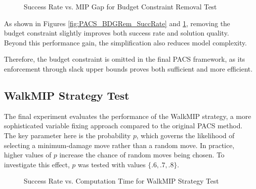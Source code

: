 \begin{figure}[H]
\centering
\begin{minipage}{0.6\columnwidth}
\centering
\resizebox{\linewidth}{!}{}
\end{minipage}%
\hfill
\begin{minipage}{0.4\columnwidth}
\centering
\resizebox{\linewidth}{!}{}
\end{minipage}
\caption{Success Rate vs. MIP Gap for Budget Constraint Removal Test}
\label{fig:PACS_BDGRem_MGAP}
\end{figure}

As shown in Figures \ref{fig:PACS_BDGRem_SuccRate} and \ref{fig:PACS_BDGRem_MGAP}, removing the budget constraint slightly improves both success rate and solution quality. Beyond this performance gain, the simplification also reduces model complexity.

Therefore, the budget constraint is omitted in the final PACS framework, as its enforcement through slack upper bounds proves both sufficient and more efficient.

\subsection{WalkMIP Strategy Test}\label{sec:test_walkMIP}
The final experiment evaluates the performance of the WalkMIP strategy, a more sophisticated variable fixing approach compared to the original PACS method. The key parameter here is the probability $p$, which governs the likelihood of selecting a minimum-damage move rather than a random move. In practice, higher values of $p$ increase the chance of random moves being chosen. To investigate this effect, $p$ was tested with values $\{.6, .7, .8\}$.
\begin{figure}[H]
\centering
\begin{minipage}{0.6\columnwidth}
\centering
\resizebox{\linewidth}{!}{}
\end{minipage}%
\hfill
\begin{minipage}{0.4\columnwidth}
\centering
\resizebox{\linewidth}{!}{}
\end{minipage}
\caption{Success Rate vs. Computation Time for WalkMIP Strategy Test}
\label{fig:PACS_WalkMIP_SuccRate}
\end{figure}

